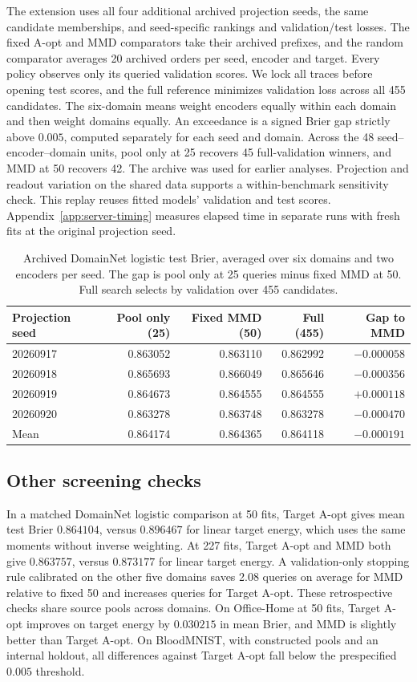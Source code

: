 \documentclass{article}
\begin{document}
The extension uses all four additional archived projection seeds, the same candidate memberships, and seed-specific rankings and validation/test losses. The fixed A-opt and MMD comparators take their archived prefixes, and the random comparator averages 20 archived orders per seed, encoder and target. Every policy observes only its queried validation scores. We lock all traces before opening test scores, and the full reference minimizes validation loss across all 455 candidates. The six-domain means weight encoders equally within each domain and then weight domains equally. An exceedance is a signed Brier gap strictly above $0.005$, computed separately for each seed and domain. Across the 48 seed--encoder--domain units, pool only at 25 recovers 45 full-validation winners, and MMD at 50 recovers 42. The archive was used for earlier analyses. Projection and readout variation on the shared data supports a within-benchmark sensitivity check. This replay reuses fitted models' validation and test scores. Appendix~\ref{app:server-timing} measures elapsed time in separate runs with fresh fits at the original projection seed.

\begin{table}[ht]
\centering
\caption{Archived DomainNet logistic test Brier, averaged over six domains and two encoders per seed. The gap is pool only at 25 queries minus fixed MMD at 50. Full search selects by validation over 455 candidates.}
\label{tab:pool-query}
\begin{tabular}{lrrrr}
\toprule
Projection seed & Pool only (25) & Fixed MMD (50) & Full (455) & Gap to MMD \\
\midrule
20260917 & 0.863052 & 0.863110 & 0.862992 & $-0.000058$ \\
20260918 & 0.865693 & 0.866049 & 0.865646 & $-0.000356$ \\
20260919 & 0.864673 & 0.864555 & 0.864555 & $+0.000118$ \\
20260920 & 0.863278 & 0.863748 & 0.863278 & $-0.000470$ \\
\midrule
Mean & 0.864174 & 0.864365 & 0.864118 & $-0.000191$ \\
\bottomrule
\end{tabular}
\end{table}

\subsection{Other screening checks}
In a matched DomainNet logistic comparison at 50 fits, Target A-opt gives mean test Brier $0.864104$, versus $0.896467$ for linear target energy, which uses the same moments without inverse weighting. At 227 fits, Target A-opt and MMD both give $0.863757$, versus $0.873177$ for linear target energy. A validation-only stopping rule calibrated on the other five domains saves 2.08 queries on average for MMD relative to fixed 50 and increases queries for Target A-opt. These retrospective checks share source pools across domains. On Office-Home at 50 fits, Target A-opt improves on target energy by $0.030215$ in mean Brier, and MMD is slightly better than Target A-opt. On BloodMNIST, with constructed pools and an internal holdout, all differences against Target A-opt fall below the prespecified $0.005$ threshold.
\end{document}
